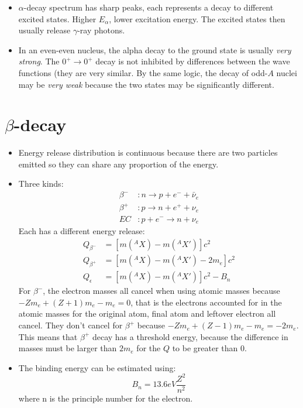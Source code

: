 \documentclass[letter]{article}
\begin{document}
\begin{itemize}
\item $\alpha$-decay spectrum has sharp peaks, each represents a decay
  to different excited states. Higher $E_\alpha$, lower excitation
  energy. The excited states then usually release $\gamma$-ray
  photons.~\cite[pp. 262-264]{krane}
\item In an even-even nucleus, the alpha decay to the ground state is
  usually \textit{very strong}. The $0^+ \to 0^+$ decay is not
  inhibited by differences between the wave functions (they are very
  similar. By the same logic, the decay of odd-$A$ nuclei may be
  \textit{very weak} because the two states may be significantly
  different.~\cite[pp.264]{krane}
\end{itemize}

\section{$\beta$-decay}
\begin{itemize}
\item Energy release distribution is continuous because there are two
  particles emitted so they can share any proportion of the
  energy.~\cite[pp. 273, Lec 19]{krane,lecture}
\item Three kinds:
  \begin{equation*}
    \begin{split}
    \beta^-&: n \to p + e^- + \bar{\nu}_e \\
    \beta^+&: p \to n + e^+ + \nu_e \\
    EC&: p + e^- \to n + \nu_e
  \end{split}
  \end{equation*}
Each has a different energy release:
\begin{equation*}
  \begin{split}
    Q_{\beta^-}&=[m(^AX)-m(^AX')]c^2 \\
    Q_{\beta^+}&=[m(^AX)-m(^AX')-2m_e]c^2\\
    Q_{\epsilon}&=[m(^AX)-m(^AX')]c^2-B_n
  \end{split}
\end{equation*}
For $\beta^-$, the electron masses all cancel when using atomic masses
because $-Zm_e+(Z+1)m_e-m_e=0$, that is the electrons accounted for in
the atomic masses for the original atom, final atom and leftover
electron all cancel. They don't cancel for $\beta^+$ because
$-Zm_e+(Z-1)m_e-m_e=-2m_e$. This means that $\beta^+$ decay has a
threshold energy, because the difference in masses must be larger than
$2m_e$ for the $Q$ to be greater than 0.~\cite[pp. 274-276]{krane}
\item The binding energy can be estimated using:
  \begin{equation*}
    B_n=13.6 eV\frac{Z^2}{n^2}
  \end{equation*}
where n is the principle number for the electron.
\end{itemize}
\end{document}
